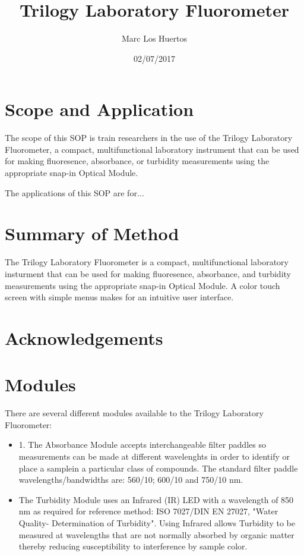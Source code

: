 \documentclass[12pt]{../SOP3_beta}
\title{Trilogy Laboratory Fluorometer}
\date{02/07/2017}
\author{Marc Los Huertos}
\begin{document}


\maketitle

\section{Scope and Application}

\NP The scope of this SOP is train researchers in the use of the Trilogy Laboratory Fluorometer, a compact, multifunctional laboratory instrument that can be used for making fluoresence, absorbance, or turbidity measurements using the appropriate snap-in Optical Module. 

\NP The applications of this SOP are for...

\section{Summary of Method}

\NP The Trilogy Laboratory Fluorometer is a compact, multifunctional laboratory insturment that can be used for making fluoresence, absorbance, and turbidity measurements using the appropriate snap-in Optical Module. A color touch screen with simple menus makes for an intuitive user interface. 

\tableofcontents

\newpage

\section{Acknowledgements}

\section{Modules}
\NP There are several different modules available to the Trilogy Laboratory Fluorometer:

\begin{itemize}
  \item 1. The Absorbance Module accepts interchangeable filter paddles so measurements can be made at different wavelenghts in order to identify or place a samplein a particular class of compounds. The standard filter paddle wavelengths/bandwidths are: 560/10; 600/10 and 750/10 nm.
  \item The Turbidity Module uses an Infrared (IR) LED with a wavelength of 850 nm as required for reference method: ISO 7027/DIN EN 27027, "Water Quality- Determination of Turbidity". Using Infrared allows Turbidity to be measured at wavelengths that are not normally absorbed by organic matter thereby reducing susceptibility to interference by sample color. 
\end{itemize}
\end{document}
